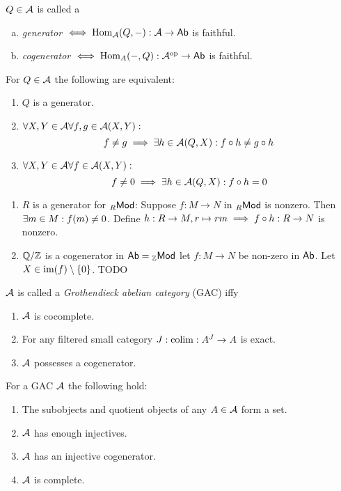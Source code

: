 \documentclass[a4paper]{report}
\begin{document}
\begin{defi} $Q \in \mathcal{A}$ is called a
  \begin{enumerate}[(a)]
    \item \emph{generator} $\iff \operatorname{Hom}_{\mathcal{A}}(Q,-): \mathcal{A} \to \mathsf{Ab}$ is faithful.
    \item \emph{cogenerator} $\iff \operatorname{Hom}_{A}(-,Q): \mathcal{A}^\mathrm{op} \to \mathsf{Ab}$ is faithful.
  \end{enumerate}
\end{defi}
\begin{rem}
  For $Q \in \mathcal{A}$ the following are equivalent:
  \begin{enumerate}
    \item $Q$ is a generator.
    \item $\forall X, Y \in \mathcal{A} \forall f, g \in \mathcal{A}(X,Y):$\[f \ne g \implies \exists h \in \mathcal{A}(Q,X): f \circ h \ne g \circ h\]
    \item $\forall X, Y \in \mathcal{A} \forall f \in \mathcal{A}(X,Y):$\[f \ne 0 \implies \exists h \in \mathcal{A}(Q,X): f \circ h = 0\]
  \end{enumerate}
\end{rem}
\begin{exmps}
  \begin{enumerate}
    \item $R$ is a generator for ${}_R\mathsf{Mod}$: Suppose $f: M \to N$ in ${}_R\mathsf{Mod}$ is nonzero. Then $\exists m \in M: f(m) \ne 0$. Define $h: R \to M, r \mapsto rm \implies f \circ h: R \to N$ is nonzero.
    \item $\mathbb{Q}/\mathbb{Z}$ is a cogenerator in $\mathsf{Ab} = {}_{\mathbb{Z}}\mathsf{Mod}$ let $f: M \to N$ be non-zero in $\mathsf{Ab}$. Let $X \in \operatorname{im}(f) \setminus \{0\}$. TODO
  \end{enumerate}
\end{exmps}
\begin{defi}$\mathcal{A}$ is called a \emph{Grothendieck abelian category} (GAC) iffy
  \begin{enumerate}
    \item $\mathcal{A}$ is cocomplete.
    \item For any filtered small category $J: \operatorname*{colim}: A^{J} \to A$ is exact.
    \item $\mathcal{A}$ possesses a cogenerator.
  \end{enumerate}
\end{defi}
\begin{thm} For a GAC $\mathcal{A}$ the following hold:
  \begin{enumerate}
    \item The subobjects and quotient objects of any $A \in \mathcal{A}$ form a set.
    \item $\mathcal{A}$ has enough injectives.
    \item $\mathcal{A}$ has an injective cogenerator.
          \item $\mathcal{A}$ is complete.
  \end{enumerate}
\end{thm}
\end{document}
